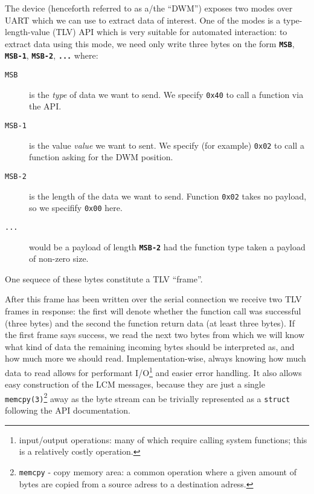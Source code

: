 The device (henceforth referred to as a/the ``DWM'') exposes two modes over UART which we can use to extract data of interest.
One of the modes is a type-length-value (TLV) API which is very suitable for automated interaction:
to extract data using this mode, we need only write three bytes on the form \texttt{\textbf{MSB}}, \texttt{\textbf{MSB-1}}, \texttt{\textbf{MSB-2}}, \texttt{\textbf{...}} where:
\begin{description}
\item[\texttt{MSB}] is the \textit{type} of data we want to send. We specify \texttt{0x40} to call a function via the API.
\item[\texttt{MSB-1}] is the value \textit{value} we want to sent. We specify (for example) \texttt{0x02} to call a function asking for the DWM position.
\item[\texttt{MSB-2}] is the length of the data we want to send. Function \texttt{0x02} takes no payload, so we specifify \texttt{0x00} here.
\item[\texttt{...}] would be a payload of length \texttt{\textbf{MSB-2}} had the function type taken a payload of non-zero size.
\end{description}
One sequece of these bytes constitute a TLV ``frame''.

After this frame has been written over the serial connection we receive two TLV frames in response:
the first will denote whether the function call was successful (three bytes) and the second the function return data (at least three bytes).
If the first frame says success, we read the next two bytes from which we will know what kind of data the remaining incoming bytes should be interpreted as,
and how much more we should read.
Implementation-wise, always knowing how much data to read allows for performant I/O\footnote{input/output operations: many of which require calling system functions; this is a relatively costly operation.} and easier error handling.
It also allows easy construction of the LCM messages, because they are just a single \texttt{memcpy(3)}\footnote{\texttt{memcpy} - copy memory area: a common operation where a given amount of bytes are copied from a source adress to a destination adress.} away as the byte stream can be trivially represented as a \texttt{struct} following the API documentation.

